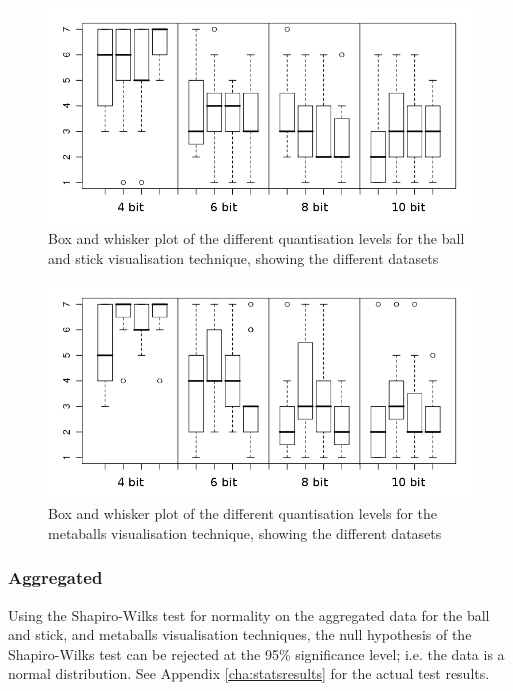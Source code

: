 \begin{figure}[h!]
  \begin{center}
    \includegraphics[width=120mm]{boxwhisker_dataset_ballstick}
  \end{center}
  \caption{Box and whisker plot of the different quantisation levels for the
  ball and stick visualisation technique, showing the different datasets}
  \label{fig:experiment_boxwhisker_dataset_ballstick}
\end{figure}

\begin{figure}[h!]
  \begin{center}
    \includegraphics[width=120mm]{boxwhisker_dataset_metaballs}
  \end{center}
  \caption{Box and whisker plot of the different quantisation levels for the
  metaballs visualisation technique, showing the different datasets}
  \label{fig:experiment_boxwhisker_dataset_metaballs}
\end{figure}


\subsubsection{Aggregated}
\label{ssub:experiment_results_aggregated}

Using the Shapiro-Wilks test for normality on the aggregated data for the ball
and stick, and metaballs visualisation techniques, the null hypothesis of the
Shapiro-Wilks test can be rejected at the 95\% significance level; i.e. the
data is a normal distribution. See Appendix \ref{cha:statsresults} for the
actual test results.

